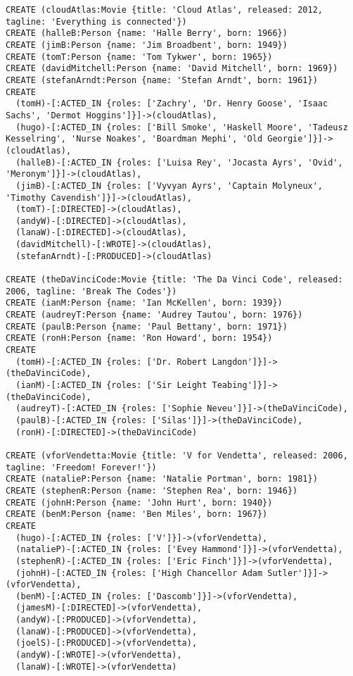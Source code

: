 \begin{lstlisting}
CREATE (cloudAtlas:Movie {title: 'Cloud Atlas', released: 2012, tagline: 'Everything is connected'})
CREATE (halleB:Person {name: 'Halle Berry', born: 1966})
CREATE (jimB:Person {name: 'Jim Broadbent', born: 1949})
CREATE (tomT:Person {name: 'Tom Tykwer', born: 1965})
CREATE (davidMitchell:Person {name: 'David Mitchell', born: 1969})
CREATE (stefanArndt:Person {name: 'Stefan Arndt', born: 1961})
CREATE
  (tomH)-[:ACTED_IN {roles: ['Zachry', 'Dr. Henry Goose', 'Isaac Sachs', 'Dermot Hoggins']}]->(cloudAtlas),
  (hugo)-[:ACTED_IN {roles: ['Bill Smoke', 'Haskell Moore', 'Tadeusz Kesselring', 'Nurse Noakes', 'Boardman Mephi', 'Old Georgie']}]->(cloudAtlas),
  (halleB)-[:ACTED_IN {roles: ['Luisa Rey', 'Jocasta Ayrs', 'Ovid', 'Meronym']}]->(cloudAtlas),
  (jimB)-[:ACTED_IN {roles: ['Vyvyan Ayrs', 'Captain Molyneux', 'Timothy Cavendish']}]->(cloudAtlas),
  (tomT)-[:DIRECTED]->(cloudAtlas),
  (andyW)-[:DIRECTED]->(cloudAtlas),
  (lanaW)-[:DIRECTED]->(cloudAtlas),
  (davidMitchell)-[:WROTE]->(cloudAtlas),
  (stefanArndt)-[:PRODUCED]->(cloudAtlas)

CREATE (theDaVinciCode:Movie {title: 'The Da Vinci Code', released: 2006, tagline: 'Break The Codes'})
CREATE (ianM:Person {name: 'Ian McKellen', born: 1939})
CREATE (audreyT:Person {name: 'Audrey Tautou', born: 1976})
CREATE (paulB:Person {name: 'Paul Bettany', born: 1971})
CREATE (ronH:Person {name: 'Ron Howard', born: 1954})
CREATE
  (tomH)-[:ACTED_IN {roles: ['Dr. Robert Langdon']}]->(theDaVinciCode),
  (ianM)-[:ACTED_IN {roles: ['Sir Leight Teabing']}]->(theDaVinciCode),
  (audreyT)-[:ACTED_IN {roles: ['Sophie Neveu']}]->(theDaVinciCode),
  (paulB)-[:ACTED_IN {roles: ['Silas']}]->(theDaVinciCode),
  (ronH)-[:DIRECTED]->(theDaVinciCode)

CREATE (vforVendetta:Movie {title: 'V for Vendetta', released: 2006, tagline: 'Freedom! Forever!'})
CREATE (natalieP:Person {name: 'Natalie Portman', born: 1981})
CREATE (stephenR:Person {name: 'Stephen Rea', born: 1946})
CREATE (johnH:Person {name: 'John Hurt', born: 1940})
CREATE (benM:Person {name: 'Ben Miles', born: 1967})
CREATE
  (hugo)-[:ACTED_IN {roles: ['V']}]->(vforVendetta),
  (natalieP)-[:ACTED_IN {roles: ['Evey Hammond']}]->(vforVendetta),
  (stephenR)-[:ACTED_IN {roles: ['Eric Finch']}]->(vforVendetta),
  (johnH)-[:ACTED_IN {roles: ['High Chancellor Adam Sutler']}]->(vforVendetta),
  (benM)-[:ACTED_IN {roles: ['Dascomb']}]->(vforVendetta),
  (jamesM)-[:DIRECTED]->(vforVendetta),
  (andyW)-[:PRODUCED]->(vforVendetta),
  (lanaW)-[:PRODUCED]->(vforVendetta),
  (joelS)-[:PRODUCED]->(vforVendetta),
  (andyW)-[:WROTE]->(vforVendetta),
  (lanaW)-[:WROTE]->(vforVendetta)


\end{lstlisting}
